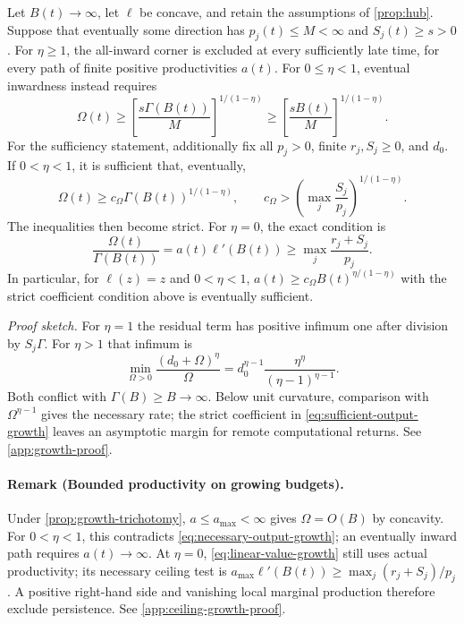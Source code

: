 \begin{proposition}
\label{prop:growth-trichotomy}
Let $B(t)\to\infty$, let $\ell$ be concave, and retain the assumptions
of \cref{prop:hub}. Suppose that eventually some direction has
$p_j(t)\leq M<\infty$ and $S_j(t)\geq s>0$.
For $\eta\geq1$, the all-inward corner is excluded at every sufficiently
late time, for every path of finite positive productivities $a(t)$.
For $0\leq\eta<1$, eventual inwardness instead requires
\begin{equation}
 \Omega(t)\geq
 \left[\frac{s\Gamma(B(t))}{M}\right]^{1/(1-\eta)}
 \geq\left[\frac{sB(t)}{M}\right]^{1/(1-\eta)}.
 \label{eq:necessary-output-growth}
\end{equation}
For the sufficiency statement, additionally fix all $p_j>0$, finite
$r_j,S_j\geq0$, and $d_0$. If $0<\eta<1$, it is sufficient that,
eventually,
\begin{equation}
 \Omega(t)\geq c_\Omega\Gamma(B(t))^{1/(1-\eta)},\qquad
 c_\Omega>
 \left(\max_j\frac{S_j}{p_j}\right)^{1/(1-\eta)}.
 \label{eq:sufficient-output-growth}
\end{equation}
The inequalities then become strict. For $\eta=0$, the exact condition is
\begin{equation}
 \frac{\Omega(t)}{\Gamma(B(t))}=a(t)\ell'(B(t))
 \geq\max_j\frac{r_j+S_j}{p_j}.
 \label{eq:linear-value-growth}
\end{equation}
In particular, for $\ell(z)=z$ and $0<\eta<1$,
$a(t)\geq c_\Omega B(t)^{\eta/(1-\eta)}$ with the strict coefficient
condition above is eventually sufficient.
\end{proposition}
\noindent\emph{Proof sketch.}
For $\eta=1$ the residual term has positive infimum one after division
by $S_j\Gamma$. For $\eta>1$ that infimum is
\begin{equation}
 \min_{\Omega>0}\frac{(d_0+\Omega)^\eta}{\Omega}
 =d_0^{\eta-1}\frac{\eta^\eta}{(\eta-1)^{\eta-1}}.
 \label{eq:residual-minimum}
\end{equation}
Both conflict with $\Gamma(B)\geq B\to\infty$. Below unit curvature,
comparison with $\Omega^{\eta-1}$ gives the necessary rate; the strict
coefficient in \cref{eq:sufficient-output-growth} leaves an asymptotic
margin for remote computational returns. See \cref{app:growth-proof}.

\paragraph{Remark (Bounded productivity on growing budgets).}
Under \cref{prop:growth-trichotomy}, $a\leq a_{\max}<\infty$ gives
$\Omega=O(B)$ by concavity. For $0<\eta<1$, this contradicts
\cref{eq:necessary-output-growth}; an eventually inward path requires
$a(t)\to\infty$. At $\eta=0$, \cref{eq:linear-value-growth} still uses
actual productivity; its necessary ceiling test is
$a_{\max}\ell'(B(t))\geq\max_j(r_j+S_j)/p_j$.
A positive right-hand side and vanishing local marginal production
therefore exclude persistence. See \cref{app:ceiling-growth-proof}.

